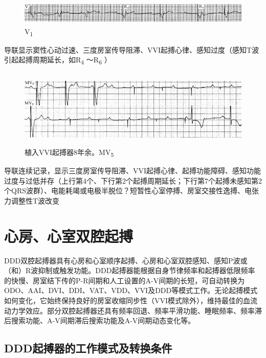 \begin{figure}[!htbp]
 \centering
 \includegraphics[width=5.58333in,height=0.45833in]{./images/Image00623.jpg}
 \captionsetup{justification=centering}
 \caption{V\textsubscript{1}}
 \label{fig38-20}
  \end{figure} 
导联显示窦性心动过速、三度房室传导阻滞、VVI起搏心律、感知过度（感知T波引起起搏周期延长，如R\textsubscript{4}
～R\textsubscript{6} ）

\begin{figure}[!htbp]
 \centering
 \includegraphics[width=5.58333in,height=1.45833in]{./images/Image00624.jpg}
 \captionsetup{justification=centering}
 \caption{植入VVI起搏器8年余。MV\textsubscript{5}}
 \label{fig38-21}
  \end{figure} 
导联连续记录，显示三度房室传导阻滞、VVI起搏心律、起搏功能障碍、感知功能过度与过低并存（上行第4个、下行第2个起搏周期延长；下行第7个起搏未感知第2个QRS波群）、电能耗竭或电极半脱位？短暂性心室停搏、房室交接性逸搏、电张力调整性T波改变

\protect\hypertarget{text00045.htmlux5cux23subid493}{}{}

\section{心房、心室双腔起搏}

DDD双腔起搏器具有心房和心室顺序起搏、心房和心室双腔感知、感知P波或（和）R波抑制或触发功能。DDD起搏器能根据自身节律频率和起搏器低限频率的快慢、房室结下传的P-R间期和人工设置的A-V间期的长短，可自动转换为ODO、AAI、DVI、DDI、VAT、VDD、VVI及DDD等模式工作。无论起搏模式如何变化，它始终保持良好的房室收缩同步性（VVI模式除外），维持最佳的血流动力学效应。部分双腔起搏器还具有频率回退、频率平滑功能、睡眠频率、频率滞后搜索功能、A-V间期滞后搜索功能及A-V间期动态变化等。

\protect\hypertarget{text00045.htmlux5cux23subid494}{}{}

\subsection{DDD起搏器的工作模式及转换条件}


